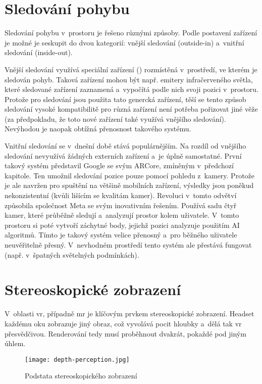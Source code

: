 \section{Sledování pohybu}

Sledování pohybu v~prostoru je řešeno různými způsoby. Podle postavení zařízení je možné je seskupit do dvou kategorií: vnější sledování (outside-in) a~vnitřní sledování (inside-out).

Vnější sledování využívá speciální zařízení () rozmístěná v~prostředí, ve kterém je sledován pohyb. Taková zařízení mohou být např. emitery infračerveného světla, které sledované zařízení zaznamená a~vypočítá podle nich svoji pozici v~prostoru. Protože pro sledování jsou použita tato genercká zařízení, těší se tento způsob sledování vysoké kompatibilitě \poml pro různá zařízení není potřeba pořizovat jiné věže (za předpokladu, že toto nové zařízení také využívá vnějšího sledování). Nevýhodou je naopak obtížná přenosnost takového systému. \cite{vr_tracking_suvi}

Vnitřní sledování se v~dnešní době stává populárnějším. Na rozdíl od vnějšího sledování nevyužívá žádných externích zařízení a~je úplně samostatné. První takový systém představil Google se svým ARCore, zmíněným v~předchozí kapitole. Ten umožnil sledování pozice pouze pomocí pohledu z~kamery. Protože je ale navržen pro spuštění na většině mobilních zařízení, výsledky jsou poněkud nekonzistentní (kvůli lišícím se kvalitám kamer).
Revoluci v~tom\-to odvětví způsobila společnost Meta se svým inovativním řešením. Používá sadu čtyř kamer, které průběžně sledují a~analyzují prostor kolem uživatele. V~tomto prostoru si poté vytvoří záchytné body, jejichž pozici analyzuje použitím AI algoritmů. Tímto je takový systém velice přenosný a~pro běžného uživatele neuvěřitelně přesný. V~nevhodném prostředí tento systém ale přestává fungovat (např. v~špatných světelných podmínkách). \cite{vr_tracking_suvi} \cite{enwiki:1182789097}

\section{Stereoskopické zobrazení}

V~oblasti \gls{vr}, případně \gls{mr} je klíčovým prvkem stereoskopické zobrazení. Headset každému oku zobrazuje jiný obraz, což vyvolává pocit hloubky a~dělá tak \gls{vr} přesvědčivou. Renderování tedy musí proběhnout dvakrát, pokaždé pod jiným úhlem. \cite{stereoskopie_diagram}

\begin{figure}[H]
    \centering
    \texttt{[image: depth-perception.jpg]}
    \caption{Podstata stereoskopického zobrazení \cite{stereoskopie_diagram}}
    \label{depth_perception}
\end{figure}


